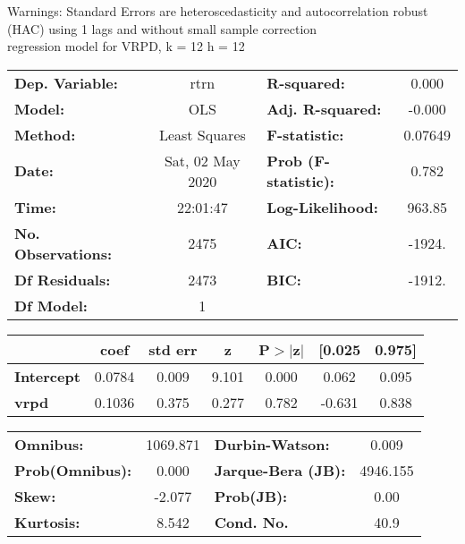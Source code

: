 Warnings: \newline
 [1] Standard Errors are heteroscedasticity and autocorrelation robust (HAC) using 1 lags and without small sample correction\\ 

regression model for VRPD, k = 12 h = 12\begin{center}
\begin{tabular}{lclc}
\toprule
\textbf{Dep. Variable:}    &       rtrn       & \textbf{  R-squared:         } &     0.000   \\
\textbf{Model:}            &       OLS        & \textbf{  Adj. R-squared:    } &    -0.000   \\
\textbf{Method:}           &  Least Squares   & \textbf{  F-statistic:       } &   0.07649   \\
\textbf{Date:}             & Sat, 02 May 2020 & \textbf{  Prob (F-statistic):} &    0.782    \\
\textbf{Time:}             &     22:01:47     & \textbf{  Log-Likelihood:    } &    963.85   \\
\textbf{No. Observations:} &        2475      & \textbf{  AIC:               } &    -1924.   \\
\textbf{Df Residuals:}     &        2473      & \textbf{  BIC:               } &    -1912.   \\
\textbf{Df Model:}         &           1      & \textbf{                     } &             \\
\bottomrule
\end{tabular}
\begin{tabular}{lcccccc}
                   & \textbf{coef} & \textbf{std err} & \textbf{z} & \textbf{P$> |$z$|$} & \textbf{[0.025} & \textbf{0.975]}  \\
\midrule
\textbf{Intercept} &       0.0784  &        0.009     &     9.101  &         0.000        &        0.062    &        0.095     \\
\textbf{vrpd}      &       0.1036  &        0.375     &     0.277  &         0.782        &       -0.631    &        0.838     \\
\bottomrule
\end{tabular}
\begin{tabular}{lclc}
\textbf{Omnibus:}       & 1069.871 & \textbf{  Durbin-Watson:     } &    0.009  \\
\textbf{Prob(Omnibus):} &   0.000  & \textbf{  Jarque-Bera (JB):  } & 4946.155  \\
\textbf{Skew:}          &  -2.077  & \textbf{  Prob(JB):          } &     0.00  \\
\textbf{Kurtosis:}      &   8.542  & \textbf{  Cond. No.          } &     40.9  \\
\bottomrule
\end{tabular}
\end{center}

